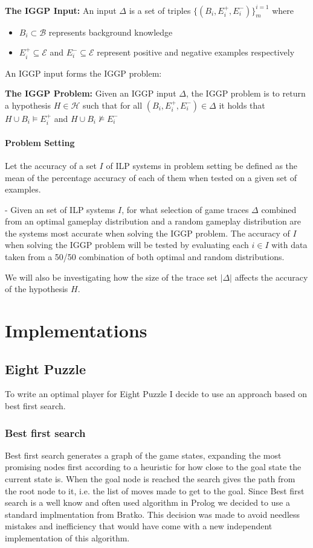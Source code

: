 \documentclass[a4paper,12pt]{report}
\begin{document}
\textbf{The IGGP Input:} An input $\Delta$ is a set of triples $\{(B_i,E_i^+,E_i^-)\}_m^{i=1}$ where
\begin{itemize}
\item $B_i \subset \mathcal{B}$ represents background knowledge
\item $E_i^+ \subseteq \mathscr{E}$ and $E_i^- \subseteq \mathscr{E}$ represent positive and negative examples respectively
\end{itemize}
An IGGP input forms the IGGP problem:

\textbf{The IGGP Problem:} Given an IGGP input $\Delta$, the IGGP problem is to return a hypothesis $H \in \mathscr{H}$ such that for all $(B_i,E_i^+,E_i^-) \in \Delta$ it holds that $H \cup B_i \vDash E_i^+$ and
$H \cup B_i \nvDash E_i^−$


\subsubsection{Problem Setting}
Let the accuracy of a set $I$ of ILP systems in problem setting be defined as the mean of the percentage accuracy of each of them when tested on a given set of examples.

- Given an set of ILP systems $I$, for what selection of game traces $\Delta$ combined from an optimal gameplay distribution and a random gameplay distribution are the systems most accurate when solving the IGGP problem. The accuracy of $I$ when solving the IGGP problem will be tested by evaluating each $i \in I$ with data taken from a 50/50 combination of both optimal and random distributions.

We will also be investigating how the size of the trace set $|\Delta|$ affects the accuracy of the hypothesis $H$.

\chapter{Implementations}
\section{Eight Puzzle}
To write an optimal player for Eight Puzzle I decide to use an approach based on best first search.
\subsection{Best first search}
Best first search generates a graph of the game states, expanding the most promising nodes first according to a heuristic for how close to the goal state the current state is. When the goal node is reached the search gives the path from the root node to it, i.e. the list of moves made to get to the goal.
Since Best first search is a well know and often used algorithm in Prolog we decided to use a standard implmentation from Bratko\cite{Bratko}. This decision was made to avoid needless mistakes and inefficiency that would have come with a new independent implementation of this algorithm.
\end{document}
